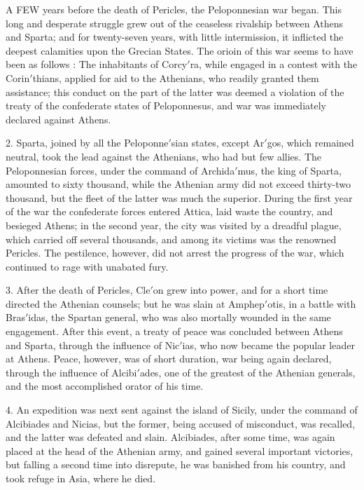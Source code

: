\documentclass[openany,a4paper]{memoir}
\begin{document}
A FEW years before the death of Pericles, the Peloponnesian war began. This long and desperate struggle 
grew out of the ceaseless rivalship between Athens and 
Sparta; and for twenty-seven years, with little intermission, 
it inflicted the deepest calamities upon the Grecian States. 
The orioin of this war seems to have been as follows : The 
inhabitants of Corcy$'$ra, while engaged in a contest with the 
Corin$'$thians, applied for aid to the Athenians, who readily 
granted them assistance; this conduct on the part of the 
latter was deemed a violation of the treaty of the confederate 
states of Peloponnesus, and war was immediately declared 
against Athens. 

2. Sparta, joined by all the Peloponne$'$sian states, except 
Ar$'$gos, which remained neutral, took the lead against the 
Athenians, who had but few allies. The Peloponnesian forces, 
under the command of Archida$'$mus, the king of Sparta, 
amounted to sixty thousand, while the Athenian army did not 
exceed thirty-two thousand, but the fleet of the latter was 
much the superior. During the first year of the war the confederate forces entered Attica, laid waste the country, and 
besieged Athens; in the second year, the city was visited by 
a dreadful plague, which carried off several thousands, and 
among its victims was the renowned Pericles. The pestilence, however, did not arrest the progress of the war, which 
continued to rage with unabated fury. 

3. After the death of Pericles, Cle$'$on grew into power, 
and for a short time directed the Athenian counsels; but he 
was slain at Amphep$'$otis, in a battle with Bras$'$idas, the 
Spartan general, who was also mortally wounded in the same 
engagement. After this event, a treaty of peace was concluded between Athens and Sparta, through the influence of 
Nic$'$ias, who now became the popular leader at Athens. 
Peace, however, was of short duration, war being again declared, through the influence of Alcibi$'$ades, one of the 
greatest of the Athenian generals, and the most accomplished 
orator of his time. 

4. An expedition was next sent against the island of Sicily, 
under the command of Alcibiades and Nicias, but the former, 
being accused of misconduct, was recalled, and the latter was 
defeated and slain. Alcibiades, after some time, was again 
placed at the head of the Athenian army, and gained several 
important victories, but falling a second time into disrepute, 
he was banished from his country, and took refuge in Asia, 
where he died. 
\end{document}
